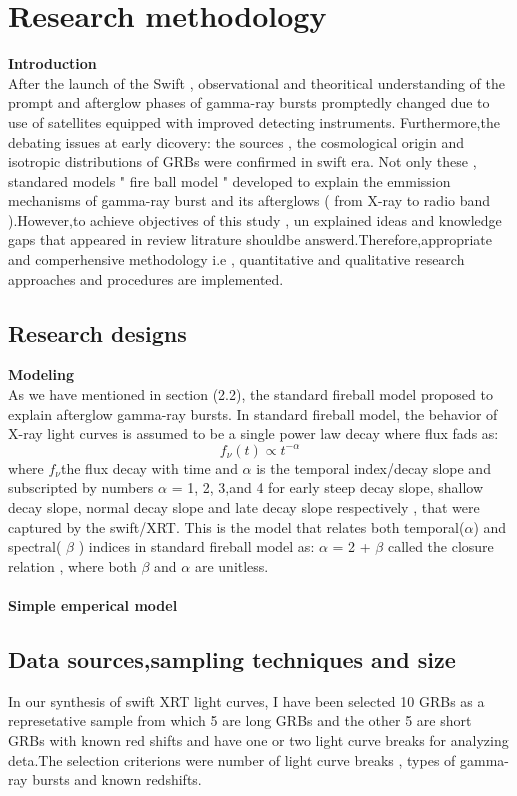 \setcounter{chapter}{2}
\chapter{Research methodology}
\label{chap:3}
\textbf{Introduction}\\
After the launch of the Swift , observational and theoritical understanding of the  prompt and afterglow phases of gamma-ray bursts promptedly changed due to use of satellites equipped with improved detecting instruments. Furthermore,the debating issues at early dicovery: the sources , the cosmological origin and isotropic distributions of GRBs were confirmed in swift era. Not only these , standared models " fire ball model " developed to explain the emmission mechanisms of gamma-ray burst and its afterglows ( from X-ray to radio band ).However,to achieve objectives of this study , un explained ideas and knowledge gaps that appeared in review litrature shouldbe answerd.Therefore,appropriate and  comperhensive methodology i.e , quantitative and qualitative research approaches and procedures are implemented.  
\section{Research designs}
\textbf{Modeling}\\
As we have mentioned in section (2.2), the  standard fireball model proposed to explain afterglow gamma-ray bursts. In standard fireball model, the behavior of X-ray light curves is assumed to be a single power law decay where flux fads  as: 
\begin{equation}
f_{\nu}(t)\propto  t^{-\alpha} 
\end{equation}
where  $f_{\nu} $the flux decay with time and  $ \alpha  $ is the temporal index/decay slope and subscripted by numbers  $ \alpha $ = 1, 2, 3,and 4 for early steep decay slope, shallow decay slope, normal decay slope and late decay slope respectively , that were captured by the swift/XRT. This  is the model that relates both temporal($ \alpha $) and spectral( $ \beta $ ) indices  in standard fireball model as:
 $\alpha$ = 2 + $\beta$  called the closure relation , where   both  $\beta $  and  $ \alpha $   are  unitless.\\\\
\textbf{Simple emperical model }\\ 
\section{Data sources,sampling techniques and  size }
In our synthesis of swift XRT light curves, I have been selected 10 GRBs as a represetative sample from which 5 are long GRBs and the other 5  are short GRBs with known red shifts and have  one or two light curve breaks for analyzing deta.The selection criterions were number of light curve breaks , types of gamma-ray bursts  and known redshifts.
